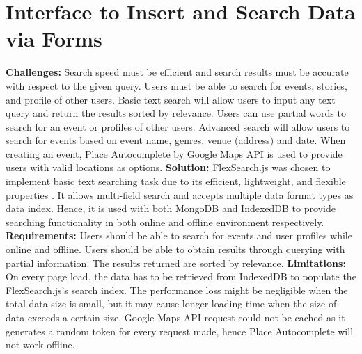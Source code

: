 \documentclass[11pt, a4paper]{article}
\begin{document}
\section{Interface to Insert and Search Data via Forms}
\textbf{Challenges:} Search speed must be efficient and search results must be accurate with respect
to the given query. Users must be able to search for events, stories, and profile of other users.
Basic text search will allow users to input any text query and return the results sorted by
relevance. Users can use partial words to search for an event or profiles of other users.
Advanced search will allow users to search for events based on event name, genres, venue (address)
and date. When creating an event, Place Autocomplete by Google Maps API \cite{google_maps_api} is
used to provide users with valid locations as options. \textbf{Solution:} FlexSearch.js
\cite{flexsearch} was chosen to implement basic text searching task due to its efficient,
lightweight, and flexible properties \cite{flexsearch_benchmarkk}. It allows multi-field search and
accepts multiple data format types as data index. Hence, it is used with both MongoDB and IndexedDB
to provide searching functionality in both online and offline environment respectively.
\textbf{Requirements:} Users should be able to search for events and user profiles while online and
offline. Users should be able to obtain results through querying with partial information. The
results returned are sorted by relevance. \textbf{Limitations:} On every page load, the data has to
be retrieved from IndexedDB to populate the FlexSearch.js's search index. The performance loss might
be negligible when the total data size is small, but it may cause longer loading time when the size
of data exceeds a certain size. Google Maps API request could not be cached as it generates a random
token for every request made, hence Place Autocomplete will not work offline.
\end{document}
